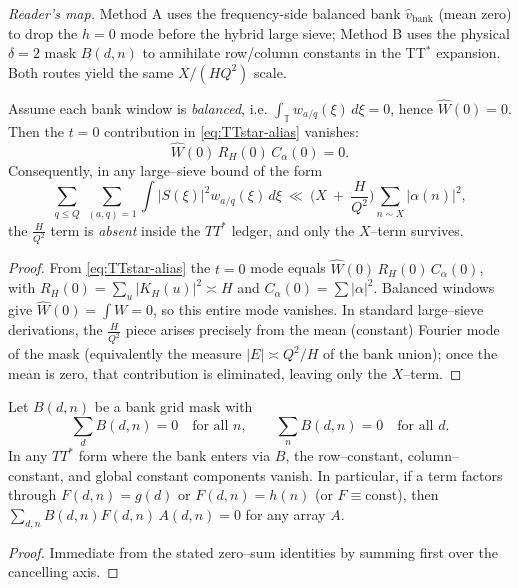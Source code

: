 \noindent\emph{Reader’s map.}
Method A uses the frequency-side balanced bank $\widehat v_{\mathrm{bank}}$ (mean zero) to drop the $h=0$ mode before the hybrid large sieve; Method B uses the physical $\delta=2$ mask $B(d,n)$ to annihilate row/column constants in the TT$^\ast$ expansion. Both routes yield the same $X/(HQ^2)$ scale.

\begin{proposition}\label{prop:alias-kills-HQ2}
Assume each bank window is \emph{balanced}, i.e. $\int_{\mathbb T} w_{a/q}(\xi)\,d\xi=0$, hence $\widehat W(0)=0$.
Then the $t=0$ contribution in \eqref{eq:TTstar-alias} vanishes:
\[
\widehat W(0)\,R_H(0)\,C_\alpha(0)=0.
\]
Consequently, in any large–sieve bound of the form
\[
\sum_{q\le Q}\ \sum_{(a,q)=1}\int |S(\xi)|^2 w_{a/q}(\xi)\,d\xi
\ \ll\ \Big(X\ +\ \frac{H}{Q^2}\Big)\sum_{n\sim X}|\alpha(n)|^2,
\]
the $\tfrac{H}{Q^2}$ term is \emph{absent} inside the $TT^\ast$ ledger, and only the $X$–term survives.
\end{proposition}

\begin{proof}
From \eqref{eq:TTstar-alias} the $t=0$ mode equals
\(
\widehat W(0)\,R_H(0)\,C_\alpha(0)
\),
with $R_H(0)=\sum_u |K_H(u)|^2\asymp H$ and $C_\alpha(0)=\sum|\alpha|^2$.
Balanced windows give $\widehat W(0)=\int W=0$, so this entire mode vanishes.
In standard large–sieve derivations, the $\frac{H}{Q^2}$ piece arises precisely from the mean (constant) Fourier mode of the mask (equivalently the measure $|E|\asymp Q^2/H$ of the bank union); once the mean is zero, that contribution is eliminated, leaving only the $X$–term.
\end{proof}

\begin{lemma}\label{lem:delta2-grid}
Let $B(d,n)$ be a bank grid mask with
\[
\sum_{d} B(d,n)=0\quad\text{for all }n,\qquad
\sum_{n} B(d,n)=0\quad\text{for all }d.
\]
In any $TT^\ast$ form where the bank enters via $B$,
the row--constant, column--constant, and global constant components vanish. In particular, if a term factors through 
$F(d,n)=g(d)$ or $F(d,n)=h(n)$ (or $F\equiv \mathrm{const}$),
then $\sum_{d,n} B(d,n)F(d,n)\,A(d,n)=0$ for any array $A$.
\end{lemma}

\begin{proof}
Immediate from the stated zero--sum identities by summing first over the cancelling axis.
\end{proof}

